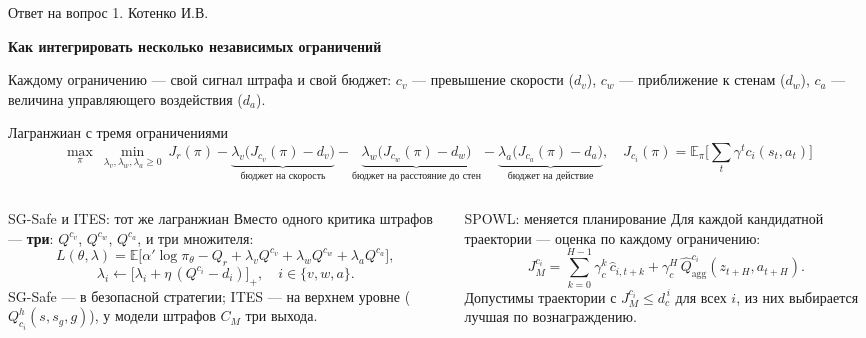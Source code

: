 \begin{frame}[noframenumbering,shrink=9]{Ответ на вопрос 1. Котенко И.В.}
    \footnotesize
    {\small\textbf{Как интегрировать несколько независимых ограничений}\par}
    \vspace{0.3em}
    Каждому ограничению --- свой сигнал штрафа и свой бюджет:
    $c_v$ --- превышение скорости ($d_v$), $c_w$ --- приближение к стенам
    ($d_w$), $c_a$ --- величина управляющего воздействия ($d_a$).
    \begin{block}{Лагранжиан с тремя ограничениями}
        \[
            \max_{\pi}\ \min_{\lambda_v,\lambda_w,\lambda_a \ge 0}\
            J_r(\pi)
            - \underbrace{\lambda_v\big(J_{c_v}(\pi) - d_v\big)}_{\text{бюджет на скорость}}
            - \underbrace{\lambda_w\big(J_{c_w}(\pi) - d_w\big)}_{\text{бюджет на расстояние до стен}}
            - \underbrace{\lambda_a\big(J_{c_a}(\pi) - d_a\big)}_{\text{бюджет на действие}},
            \quad
            J_{c_i}(\pi) = \mathbb{E}_\pi\Big[\sum_t \gamma^t c_i(s_t, a_t)\Big]
        \]
    \end{block}
    \begin{columns}[T,onlytextwidth]
        \begin{column}{0.49\textwidth}
            \begin{block}{SG-Safe и ITES: тот же лагранжиан}
                Вместо одного критика штрафов --- \textbf{три}:
                $Q^{c_v}$, $Q^{c_w}$, $Q^{c_a}$, и три множителя:
                \[
                    L(\theta,\lambda) = \mathbb{E}\Big[\alpha'\log\pi_\theta
                    - Q_r + \lambda_v Q^{c_v} + \lambda_w Q^{c_w}
                    + \lambda_a Q^{c_a}\Big],
                \]
                \[
                    \lambda_i \leftarrow
                    \big[\lambda_i + \eta\,(Q^{c_i} - d_i)\big]_{+},
                    \quad i \in \{v, w, a\}.
                \]
                SG-Safe --- в безопасной стратегии; ITES --- на верхнем уровне
                ($Q^h_{c_i}(s, s_g, g)$), у модели штрафов $C_M$ три выхода.
            \end{block}
        \end{column}
        \begin{column}{0.49\textwidth}
            \begin{block}{SPOWL: меняется планирование}
                Для каждой кандидатной траектории --- оценка по каждому
                ограничению:
                \[
                    J^{c_i}_M = \sum_{k=0}^{H-1}\gamma_c^k\,\hat{c}_{i,t+k}
                    + \gamma_c^H\,\hat{Q}^{c_i}_{\mathrm{agg}}(z_{t+H}, a_{t+H}).
                \]
                Допустимы траектории с $J^{c_i}_M \le d^{\,i}_c$ для всех $i$,
                из них выбирается лучшая по вознаграждению.
            \end{block}
        \end{column}
    \end{columns}
\end{frame}

